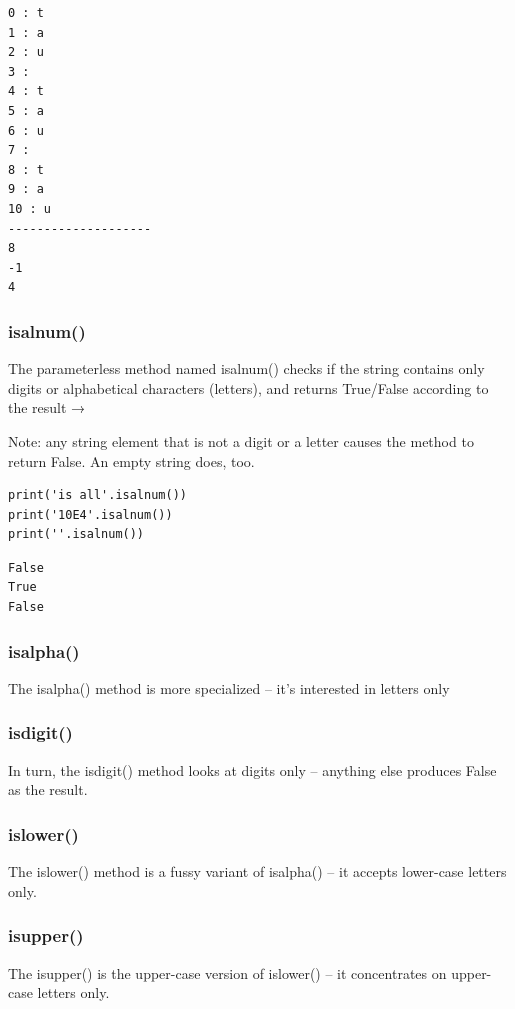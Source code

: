 \documentclass[11pt]{article}
\begin{document}
\begin{verbatim}
0 : t
1 : a
2 : u
3 :  
4 : t
5 : a
6 : u
7 :  
8 : t
9 : a
10 : u
--------------------
8
-1
4
\end{verbatim}

\subsubsection{isalnum()}
\label{sec:org7944cd8}
The parameterless method named isalnum() checks if the string contains
only digits or alphabetical characters (letters), and returns
True/False according to the result →

Note: any string element that is not a digit or a letter causes the
method to return False. An empty string does, too.

\begin{verbatim}
print('is all'.isalnum())
print('10E4'.isalnum())
print(''.isalnum())
\end{verbatim}

\begin{verbatim}
False
True
False
\end{verbatim}

\subsubsection{isalpha()}
\label{sec:org6d35e8e}
The isalpha() method is more specialized – it’s interested in letters
only

\subsubsection{isdigit()}
\label{sec:org7698e55}
In turn, the isdigit() method looks at digits only – anything else
produces False as the result.

\subsubsection{islower()}
\label{sec:org3b280a9}
The islower() method is a fussy variant of isalpha() – it accepts
lower-case letters only.

\subsubsection{isupper()}
\label{sec:org236f12a}
The isupper() is the upper-case version of islower() – it concentrates
on upper-case letters only.
\end{document}
